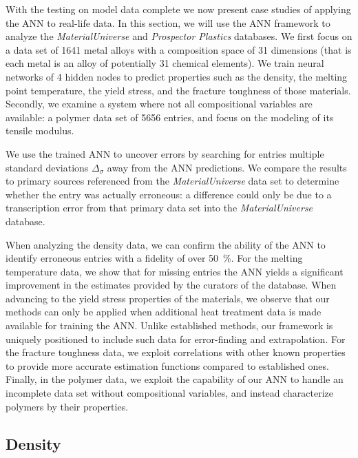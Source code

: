 \documentclass[review]{elsarticle}
\newcommand{\change}[1]{#1}
\begin{document}
With the testing on model data complete we now present case studies of
applying the ANN to real-life data. In this section, we will use the ANN
framework to analyze the \textit{MaterialUniverse} and \textit{Prospector
  Plastics} databases. We first focus on a data set of 1641 metal alloys
with a composition space of 31 dimensions (that is each metal is an alloy of
potentially 31 chemical elements). We train neural networks of 4 hidden
nodes to predict properties such as the density, the melting point
temperature, the yield stress, and the fracture toughness of those
materials. Secondly, we examine a system where not all compositional
variables are available: a polymer data set of 5656 entries, and focus on
the modeling of its tensile modulus.

\change{We use the trained ANN to uncover errors by searching for
  entries multiple standard deviations $\Delta_{\sigma}$ away from the ANN
  predictions. We compare the results to primary sources referenced from the
  \textit{MaterialUniverse} data set to determine whether the entry was
  actually erroneous: a difference could only be due to a transcription
  error from that primary data set into the \textit{MaterialUniverse}
  database.}

When analyzing the density data, we can confirm the ability of the ANN to
identify erroneous entries with a fidelity of over \SI{50}{\percent}. For
the melting temperature data, we show that for missing entries the ANN
yields a significant improvement in the estimates provided by the curators
of the database. When advancing to the yield stress properties of the
materials, we observe that our methods can only be applied when additional
heat treatment data is made available for training the ANN. Unlike
established methods, our framework is uniquely positioned to include such
data for error-finding and extrapolation. For the fracture toughness data,
we exploit correlations with other known properties to provide more accurate
estimation functions compared to established ones.  Finally, in the polymer
data, we exploit the capability of our ANN to handle an incomplete data set
without compositional variables, and instead characterize polymers by their
properties.

\subsection{Density}\label{sec:density}
\end{document}

